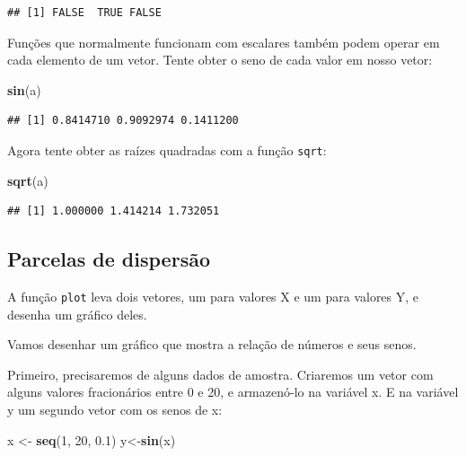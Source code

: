 \documentclass[]{book}
\newenvironment{Shaded}{\begin{snugshade}}{\end{snugshade}}
\newcommand{\DecValTok}[1]{\textcolor[rgb]{0.00,0.00,0.81}{#1}}
\newcommand{\FloatTok}[1]{\textcolor[rgb]{0.00,0.00,0.81}{#1}}
\newcommand{\KeywordTok}[1]{\textcolor[rgb]{0.13,0.29,0.53}{\textbf{#1}}}
\newcommand{\NormalTok}[1]{#1}
\newcommand{\StringTok}[1]{\textcolor[rgb]{0.31,0.60,0.02}{#1}}
\begin{document}
\begin{verbatim}
## [1] FALSE  TRUE FALSE
\end{verbatim}

Funções que normalmente funcionam com escalares também podem operar em cada elemento de um vetor. Tente obter o seno de cada valor em nosso vetor:

\begin{Shaded}
\begin{Highlighting}[]
\KeywordTok{sin}\NormalTok{(a)}
\end{Highlighting}
\end{Shaded}

\begin{verbatim}
## [1] 0.8414710 0.9092974 0.1411200
\end{verbatim}

Agora tente obter as raízes quadradas com a função \texttt{sqrt}:

\begin{Shaded}
\begin{Highlighting}[]
\KeywordTok{sqrt}\NormalTok{(a)}
\end{Highlighting}
\end{Shaded}

\begin{verbatim}
## [1] 1.000000 1.414214 1.732051
\end{verbatim}

\hypertarget{parcelas-de-dispersao}{%
\subsection{Parcelas de dispersão}\label{parcelas-de-dispersao}}

A função \texttt{plot} leva dois vetores, um para valores X e um para valores Y, e desenha um gráfico deles.

Vamos desenhar um gráfico que mostra a relação de números e seus senos.

Primeiro, precisaremos de alguns dados de amostra. Criaremos um vetor com alguns valores fracionários entre 0 e 20, e armazenó-lo na variável x. E na variável y um segundo vetor com os senos de x:

\begin{Shaded}
\begin{Highlighting}[]
\NormalTok{x <-}\StringTok{ }\KeywordTok{seq}\NormalTok{(}\DecValTok{1}\NormalTok{, }\DecValTok{20}\NormalTok{, }\FloatTok{0.1}\NormalTok{)}
\NormalTok{y<-}\KeywordTok{sin}\NormalTok{(x)}
\end{Highlighting}
\end{Shaded}
\end{document}
